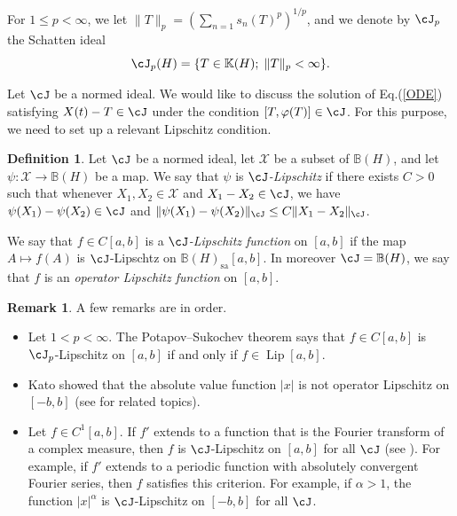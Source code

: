 \documentclass[12pt]{article}
\theoremstyle{definition}
\newtheorem{definition}[theorem]{Definition}
\newtheorem{remark}[theorem]{Remark}
\numberwithin{equation}{section}
\newcommand{\B}{\mathbb{B}}
\newcommand{\K}{\mathbb{K}}
\newcommand{\cX}{\mathcal{X}}
\DeclareMathOperator{\Lip}{Lip}
\begin{document}
For $1\leq p<\infty$, we let $\|T \|_p=(\sum_{n=1}s_n(T)^p)^{1/p}$, and we denote by $\cJ_p$ the Schatten ideal 
\[\cJ_p(H)=\{T\in \K(H);\; \|T\|_p<\infty\}.\]  


Let $\cJ$ be a normed ideal. 
We would like to discuss the solution of Eq.(\ref{ODE}) satisfying $X(t)-T\in \cJ$ under 
the condition $[T,\varphi(T)]\in \cJ$. 
For this purpose, we need to set up a relevant Lipschitz condition.  
 
\begin{definition} Let $\cJ$ be a normed ideal, let $\cX$ be a subset of $\B(H)$, and let $\psi :\cX\to \B(H)$ be a map. 
We say that $\psi$ is \textit{$\cJ$-Lipschitz} if there exists $C>0$ such that whenever $X_1,X_2\in \cX$ and $X_1-X_2\in \cJ$, 
we have $\psi(X_1)-\psi(X_2)\in \cJ$ and $\|\psi(X_1)-\psi(X_2)\|_\cJ\leq C\|X_1-X_2\|_\cJ$. 

We say that $f\in C[a,b]$ is a \textit{$\cJ$-Lipschitz function} on $[a,b]$ if the map $A\mapsto f(A)$ is $\cJ$-Lipschtz on $\B(H)_{\mathrm{sa}}[a,b]$. 
In moreover $\cJ=\B(H)$, we say that $f$ is an \textit{operator Lipschitz function} on $[a,b]$. 
\end{definition}

\begin{remark} A few remarks are in order. 
\begin{itemize}
\item [(1)] Let $1<p<\infty$. 
The Potapov--Sukochev theorem \cite[Theorem 1]{PS2011} says that $f\in C[a,b]$ is $\cJ_p$-Lipschitz on $[a,b]$ if and only if $f\in \Lip[a,b]$. 
\item [(2)] Kato \cite{K1973} showed that the absolute value function $|x|$ is not operator Lipschitz on $[-b,b]$  
(see  \cite{K1992} for related topics). 
\item [(3)] 
Let $f\in C^1[a,b]$. 
If $f'$ extends to a function that is the Fourier transform of a complex measure, 
then $f$ is $\cJ$-Lipschitz on $[a,b]$ for all $\cJ$ (see \cite[Theorem 1.1.1]{AP2016}). 
For example, if $f'$ extends to a periodic function with absolutely convergent Fourier series, then 
$f$ satisfies this criterion. 
For example, if $\alpha>1$, the function $|x|^\alpha$ is $\cJ$-Lipschitz on $[-b,b]$ for all $\cJ$.   
\end{itemize}
\end{remark}
\end{document}
